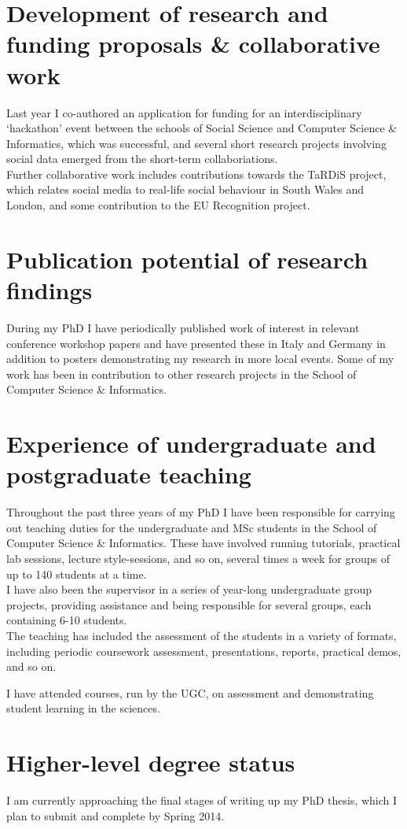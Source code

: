 \documentclass[10pt,a4paper]{article}
\begin{document}
\section*{Development of research and funding proposals \& collaborative work}
Last year I co-authored an application for funding for an interdisciplinary `hackathon' event between the schools of Social Science and Computer Science \& Informatics, which was successful, and several short research projects involving social data emerged from the short-term collaboriations.\\
Further collaborative work includes contributions towards the TaRDiS project, which relates social media to real-life social behaviour in South Wales and London, and some contribution to the EU Recognition project. 

\section*{Publication potential of research findings}
During my PhD I have periodically published work of interest in relevant conference workshop papers and have presented these in Italy and Germany in addition to posters demonstrating my research in more local events. Some of my work has been in contribution to other research projects in the School of Computer Science \& Informatics.

\section*{Experience of undergraduate and postgraduate teaching}
Throughout the past three years of my PhD I have been responsible for carrying out teaching duties for the undergraduate and MSc students in the School of Computer Science \& Informatics. These have involved running tutorials, practical lab sessions, lecture style-sessions, and so on, several times a week for groups of up to 140 students at a time.\\
I have also been the supervisor in a series of year-long undergraduate group projects, providing assistance and being responsible for several groups, each containing 6-10 students.\\
The teaching has included the assessment of the students in a variety of formats, including periodic coursework assessment, presentations, reports, practical demos, and so on.

I have attended courses, run by the UGC, on assessment and demonstrating student learning in the sciences.

\section*{Higher-level degree status}
I am currently approaching the final stages of writing up my PhD thesis, which I plan to submit and complete by Spring 2014.
\end{document}
